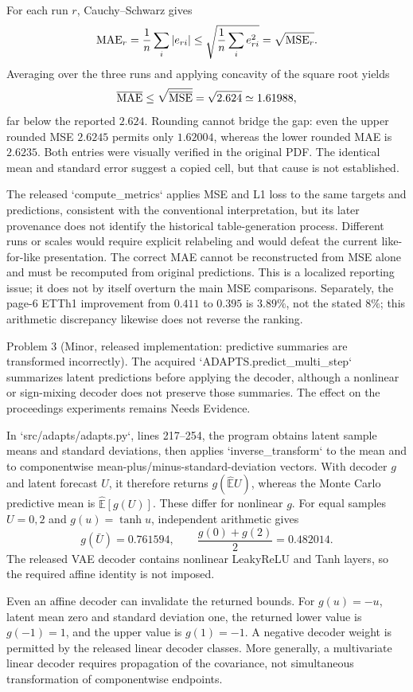 \documentclass[10pt]{article}
\begin{document}
For each run \(r\), Cauchy–Schwarz gives \[{\rm MAE}_r=\frac1n\sum_i|e_{ri}|
 \leq\sqrt{\frac1n\sum_i e_{ri}^2}
 =\sqrt{{\rm MSE}_r}.\] Averaging over the three runs and applying concavity of the square root yields \[\overline{\rm MAE}\leq\sqrt{\overline{\rm MSE}}
 =\sqrt{2.624}\simeq1.61988,\] far below the reported \(2.624\). Rounding cannot bridge the gap: even the upper rounded MSE \(2.6245\) permits only \(1.62004\), whereas the lower rounded MAE is \(2.6235\). Both entries were visually verified in the original PDF. The identical mean and standard error suggest a copied cell, but that cause is not established.\par
The released `compute\_metrics` applies MSE and L1 loss to the same targets and predictions, consistent with the conventional interpretation, but its later provenance does not identify the historical table-generation process. Different runs or scales would require explicit relabeling and would defeat the current like-for-like presentation. The correct MAE cannot be reconstructed from MSE alone and must be recomputed from original predictions. This is a localized reporting issue; it does not by itself overturn the main MSE comparisons. Separately, the page-6 ETTh1 improvement from \(0.411\) to \(0.395\) is \(3.89\%\), not the stated \(8\%\); this arithmetic discrepancy likewise does not reverse the ranking.\par
Problem 3 (Minor, released implementation: predictive summaries are transformed incorrectly).  The acquired `ADAPTS.predict\_multi\_step` summarizes latent predictions before applying the decoder, although a nonlinear or sign-mixing decoder does not preserve those summaries. The effect on the proceedings experiments remains Needs Evidence.\par
In `src/adapts/adapts.py`, lines 217–254, the program obtains latent sample means and standard deviations, then applies `inverse\_transform` to the mean and to componentwise mean-plus/minus-standard-deviation vectors. With decoder \(g\) and latent forecast \(U\), it therefore returns \(g(\widehat{\mathbb E}U)\), whereas the Monte Carlo predictive mean is \(\widehat{\mathbb E}[g(U)]\). These differ for nonlinear \(g\). For equal samples \(U=0,2\) and \(g(u)=\tanh u\), independent arithmetic gives \[g(\bar U)=0.761594,\qquad
 \frac{g(0)+g(2)}2=0.482014.\] The released VAE decoder contains nonlinear LeakyReLU and Tanh layers, so the required affine identity is not imposed.\par
Even an affine decoder can invalidate the returned bounds. For \(g(u)=-u\), latent mean zero and standard deviation one, the returned lower value is \(g(-1)=1\), and the upper value is \(g(1)=-1\). A negative decoder weight is permitted by the released linear decoder classes. More generally, a multivariate linear decoder requires propagation of the covariance, not simultaneous transformation of componentwise endpoints.\par
\end{document}
